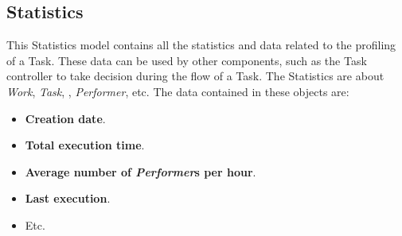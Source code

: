\subsection{Statistics}
This Statistics model contains all the statistics and data related to the profiling
of a Task. These data can be used by other components, such as the Task controller
to take decision during the flow of a Task. The Statistics are about \emph{Work},
\emph{Task}, \emph{\utask{}}, \emph{Performer}, etc. The data contained in these
objects are:
\begin{itemize}
    \item \textbf{Creation date}.
    \item \textbf{Total execution time}.
    \item \textbf{Average number of \emph{Performer}s per hour}.
    \item \textbf{Last execution}.
    \item Etc.
\end{itemize}
